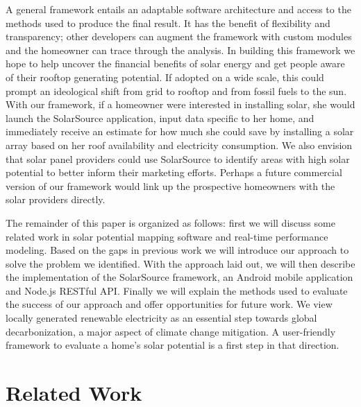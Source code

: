 \documentclass[pageno]{jpaper}
\begin{document}
A general framework entails an adaptable software architecture and access to the methods used to produce the final result. It has the benefit of flexibility and transparency; other developers can augment the framework with custom modules and the homeowner can trace through the analysis. In building this framework we hope to help uncover the financial benefits of solar energy and get people aware of their rooftop generating potential. If adopted on a wide scale, this could prompt an ideological shift from grid to rooftop and from fossil fuels to the sun. With our framework, if a homeowner were interested in installing solar, she would launch the SolarSource application, input data specific to her home, and immediately receive an estimate for how much she could save by installing a solar array based on her roof availability and electricity consumption. We also envision that solar panel providers could use SolarSource to identify areas with high solar potential to better inform their marketing efforts. Perhaps a future commercial version of our framework would link up the prospective homeowners with the solar providers directly.

The remainder of this paper is organized as follows: first we will discuss some related work in solar potential mapping software and real-time performance modeling. Based on the gaps in previous work we will introduce our approach to solve the problem we identified. With the approach laid out, we will then describe the implementation of the SolarSource framework, an Android mobile application and Node.js RESTful API. Finally we will explain the methods used to evaluate the success of our approach and offer opportunities for future work. We view locally generated renewable electricity as an essential step towards global decarbonization, a major aspect of climate change mitigation. A user-friendly framework to evaluate a home's solar potential is a first step in that direction.

\section{Related Work}
\end{document}
